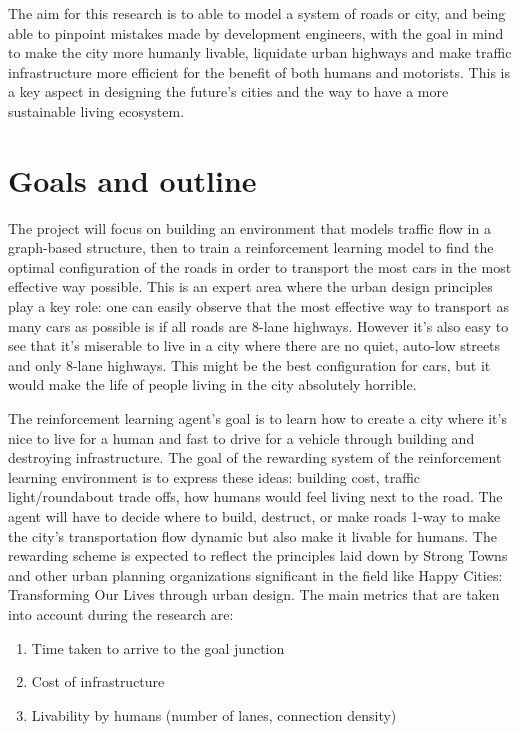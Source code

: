 \documentclass[
]{elteikthesis}[2023/04/10]
\begin{document}
The aim for this research is to able to model a system of roads or
city, and being able to pinpoint mistakes made by development engineers,
with the goal in mind to make the city more humanly livable, liquidate
urban highways and make traffic infrastructure more efficient for
the benefit of both humans and motorists. This is a key aspect in
designing the future's cities and the way to have a more sustainable
living ecosystem.

\section{Goals and outline}

The project will focus on building an environment that models traffic
flow in a graph-based structure, then to train a reinforcement learning
model to find the optimal configuration of the roads in order to transport
the most cars in the most effective way possible. This is an expert
area where the urban design principles play a key role: one can easily
observe that the most effective way to transport as many cars as possible
is if all roads are 8-lane highways. However it's also easy to see
that it's miserable to live in a city where there are no quiet, auto-low
streets and only 8-lane highways. This might be the best configuration
for cars, but it would make the life of people living in the city
absolutely horrible. 

The reinforcement learning agent's goal is to learn how to create
a city where it's nice to live for a human and fast to drive for a
vehicle through building and destroying infrastructure. The goal of
the rewarding system of the reinforcement learning environment is
to express these ideas: building cost, traffic light/roundabout trade
offs, how humans would feel living next to the road. The agent will
have to decide where to build, destruct, or make roads 1-way to make
the city's transportation flow dynamic but also make it livable for
humans. The rewarding scheme is expected to reflect the principles
laid down by Strong Towns and other urban planning organizations significant
in the field like Happy Cities: Transforming Our Lives through urban
design. The main metrics that are taken into account during the research
are:
\begin{enumerate}
\item Time taken to arrive to the goal junction
\item Cost of infrastructure
\item Livability by humans (number of lanes, connection density)
\end{enumerate}
\end{document}
